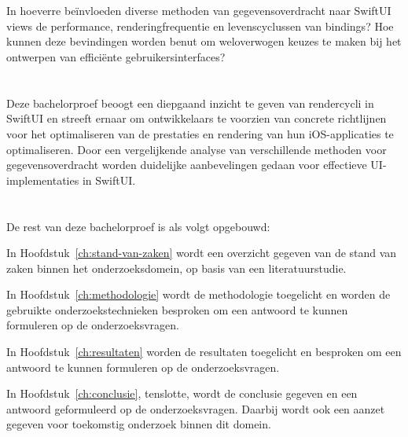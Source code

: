 \section{}%
\label{sec:onderzoeksvraag}
In hoeverre beïnvloeden diverse methoden van
gegevensoverdracht naar SwiftUI views de performance,
renderingfrequentie en levenscyclussen
van bindings? Hoe kunnen deze bevindingen
worden benut om weloverwogen keuzes te maken
bij het ontwerpen van efficiënte gebruikersinterfaces?

\section{}%
\label{sec:onderzoeksdoelstelling}


Deze bachelorproef beoogt een diepgaand inzicht te geven
van rendercycli in SwiftUI en streeft ernaar
om ontwikkelaars te voorzien van concrete
richtlijnen voor het optimaliseren van de prestaties
en rendering van hun iOS-applicaties te optimaliseren. Door
een vergelijkende analyse van verschillende
methoden voor gegevensoverdracht worden duidelijke aanbevelingen gedaan voor effectieve UI-implementaties
in SwiftUI.
\section{}%
\label{sec:opzet-bachelorproef}


De rest van deze bachelorproef is als volgt opgebouwd:

In Hoofdstuk~\ref{ch:stand-van-zaken} wordt een overzicht gegeven van de stand van zaken binnen het onderzoeksdomein, op basis van een literatuurstudie.

In Hoofdstuk~\ref{ch:methodologie} wordt de methodologie toegelicht en worden de gebruikte onderzoekstechnieken besproken om een antwoord te kunnen formuleren op de onderzoeksvragen.

In Hoofdstuk~\ref{ch:resultaten} worden de resultaten toegelicht en besproken om een antwoord te kunnen formuleren op de onderzoeksvragen.

In Hoofdstuk~\ref{ch:conclusie}, tenslotte, wordt de conclusie gegeven en een antwoord geformuleerd op de onderzoeksvragen. Daarbij wordt ook een aanzet gegeven voor toekomstig onderzoek binnen dit domein.